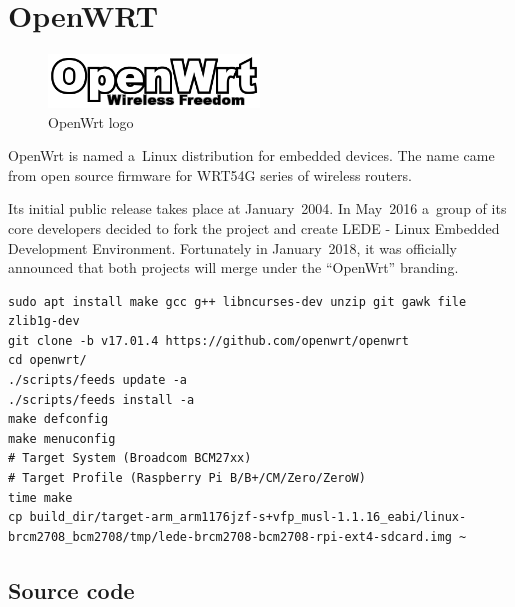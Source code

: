 \documentclass[printmode]{mgr}
\begin{document}
\section{OpenWRT}

\begin{figure}[htbp]
  \centering
    \includegraphics[width=0.5\textwidth]{openwrt-logo.png}
    \caption{OpenWrt logo}
  \label{fig:openwrt-logo}
\end{figure}

OpenWrt is named a~Linux distribution for embedded devices. The name came from open source firmware for WRT54G series of wireless routers.

Its initial public release takes place at January~2004. In May~2016 a~group of its core developers decided to fork the project and create LEDE - Linux Embedded Development Environment. Fortunately in January~2018, it was officially announced that both projects will merge under the ``OpenWrt'' branding.





\begin{lstlisting}
sudo apt install make gcc g++ libncurses-dev unzip git gawk file zlib1g-dev
git clone -b v17.01.4 https://github.com/openwrt/openwrt
cd openwrt/
./scripts/feeds update -a
./scripts/feeds install -a
make defconfig
make menuconfig
# Target System (Broadcom BCM27xx)
# Target Profile (Raspberry Pi B/B+/CM/Zero/ZeroW)
time make
cp build_dir/target-arm_arm1176jzf-s+vfp_musl-1.1.16_eabi/linux-brcm2708_bcm2708/tmp/lede-brcm2708-bcm2708-rpi-ext4-sdcard.img ~
\end{lstlisting}



\subsection*{Source code}
\end{document}
